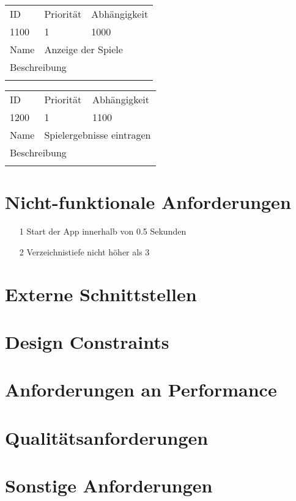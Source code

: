 	\begin{tabularx}{\textwidth}{|l|l|l|}
		ID & Priorität & Abhängigkeit \\
		1100 & 1 & 1000\\
		\hline
		Name & \multicolumn{2}{l}{Anzeige der Spiele} \\
		\multicolumn{3}{l}{Beschreibung}\\
		\multicolumn{3}{l}{}\\
		\hline		 
	\end{tabularx}
	
	\begin{tabularx}{\textwidth}{|l|l|l|}
		ID & Priorität & Abhängigkeit \\
		1200 & 1 & 1100\\
		\hline
		Name & \multicolumn{2}{l}{Spielergebnisse eintragen} \\
		\multicolumn{3}{l}{Beschreibung}\\
		\multicolumn{3}{l}{}\\
		\hline		 
	\end{tabularx}

\section{Nicht-funktionale Anforderungen}
	\begin{itemize}
		\item[1] Start der App innerhalb von 0.5 Sekunden
		\item[2] Verzeichnistiefe nicht höher als 3
	\end{itemize}
	
\section{Externe Schnittstellen}
\section{Design Constraints}
\section{Anforderungen an Performance}
\section{Qualitätsanforderungen}
\section{Sonstige Anforderungen}
